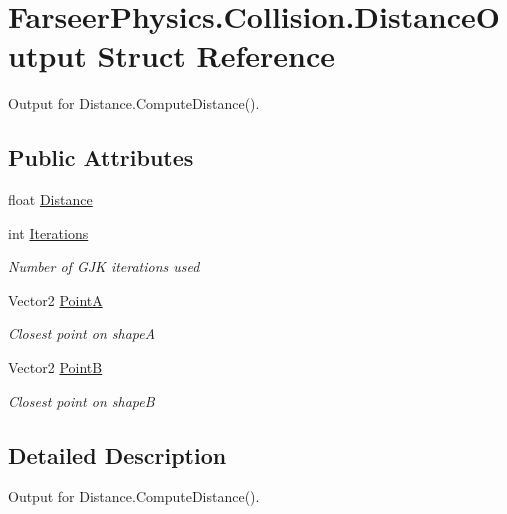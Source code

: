 \hypertarget{struct_farseer_physics_1_1_collision_1_1_distance_output}{\section{Farseer\+Physics.\+Collision.\+Distance\+Output Struct Reference}
\label{struct_farseer_physics_1_1_collision_1_1_distance_output}
}


Output for Distance.\+Compute\+Distance().  


\subsection*{Public Attributes}
\begin{DoxyCompactItemize}
\item 
float \hyperlink{struct_farseer_physics_1_1_collision_1_1_distance_output_adc6f949938ce044cecae31dc220359e2}{Distance}
\item 
int \hyperlink{struct_farseer_physics_1_1_collision_1_1_distance_output_a5c37d41ac765aa1cc9cbd4b231c95f92}{Iterations}
\begin{DoxyCompactList}\small\item\em Number of G\+J\+K iterations used \end{DoxyCompactList}\item 
Vector2 \hyperlink{struct_farseer_physics_1_1_collision_1_1_distance_output_af9a9daa217c8255547fbffd40348597e}{Point\+A}
\begin{DoxyCompactList}\small\item\em Closest point on shape\+A \end{DoxyCompactList}\item 
Vector2 \hyperlink{struct_farseer_physics_1_1_collision_1_1_distance_output_a90ea5536107ceb77b75fc66b2d954570}{Point\+B}
\begin{DoxyCompactList}\small\item\em Closest point on shape\+B \end{DoxyCompactList}\end{DoxyCompactItemize}


\subsection{Detailed Description}
Output for Distance.\+Compute\+Distance(). 



